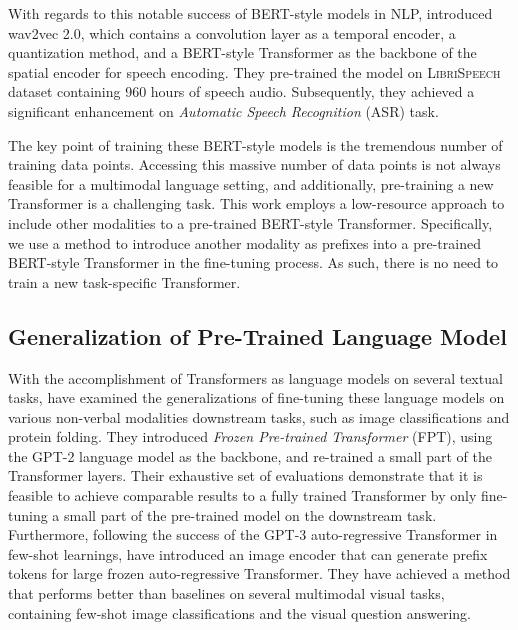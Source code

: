 \documentclass[letterpaper]{article} \usepackage{spconf,amsmath,graphicx}
\begin{document}
With regards to this notable success of BERT-style models in NLP, \cite{baevski2020wav2vec} introduced wav2vec 2.0, which contains a convolution layer as a temporal encoder, a quantization method, and a BERT-style Transformer as the backbone of the spatial encoder for speech encoding. They pre-trained the model on \textsc{LibriSpeech} dataset \cite{panayotov2015librispeech} containing 960 hours of speech audio. Subsequently, they achieved a significant enhancement on \textit{Automatic Speech Recognition} (ASR) task.

The key point of training these BERT-style models is the tremendous number of training data points. Accessing this massive number of data points is not always feasible for a multimodal language setting, and additionally, pre-training a new Transformer is a challenging task. This work employs a low-resource approach to include other modalities to a pre-trained BERT-style Transformer. Specifically, we use a method to introduce another modality as prefixes into a pre-trained BERT-style Transformer in the fine-tuning process. As such, there is no need to train a new task-specific Transformer.

\subsection{Generalization of Pre-Trained Language Model}

With the accomplishment of Transformers as language models on several textual tasks, \cite{lu2021pretrained} have examined the generalizations of fine-tuning these language models on various non-verbal modalities downstream tasks, such as image classifications and protein folding. They introduced \textit{Frozen Pre-trained Transformer} (FPT), using the GPT-2 \cite{radford2019language} language model as the backbone, and re-trained a small part of the Transformer layers. Their exhaustive set of evaluations demonstrate that it is feasible to achieve comparable results to a fully trained Transformer by only fine-tuning a small part of the pre-trained model on the downstream task.  Furthermore, following the success of the GPT-3 \cite{brown2020language} auto-regressive Transformer in few-shot learnings, \cite{tsimpoukelli2021multimodal} have introduced an image encoder that can generate prefix tokens for large frozen auto-regressive Transformer. They have achieved a method that performs better than baselines on several multimodal visual tasks, containing few-shot image classifications and the visual question answering. 
\end{document}
